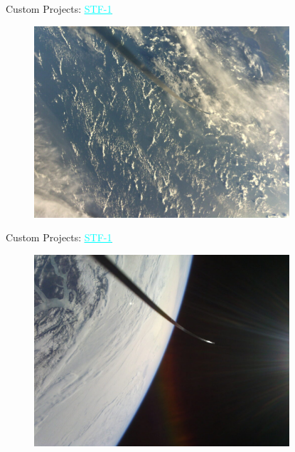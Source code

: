 \begin{frame}{Custom Projects: \href{http://stf1.com/}{\textcolor{cyan}{\underline{STF-1}}}}

    \begin{figure}[!ht]
        \begin{center}
            \includegraphics[width=9.5cm]{figures/stf-1-ex5.jpg}
        \end{center}
    \end{figure}

\end{frame}

\begin{frame}{Custom Projects: \href{http://stf1.com/}{\textcolor{cyan}{\underline{STF-1}}}}

    \begin{figure}[!ht]
        \begin{center}
            \includegraphics[width=9.5cm]{figures/stf-1-ex6.jpg}
        \end{center}
    \end{figure}

\end{frame}